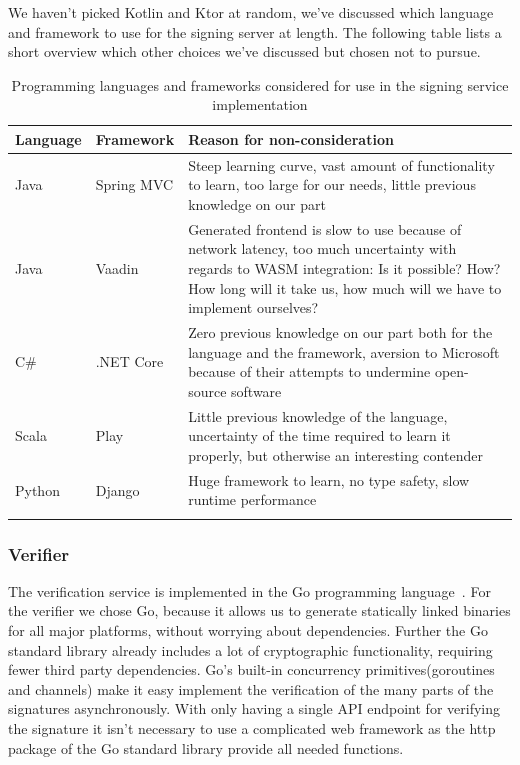 We haven't picked Kotlin and Ktor at random, we've discussed which language and framework to use for the signing server at length.
The following table lists a short overview which other choices we've discussed but chosen not to pursue.

\begin{longtable}{p{1.5cm}p{2cm}p{11cm}}
    \hline
    \textbf{Language} & \textbf{Framework} & \textbf{Reason for non-consideration} \\ \hline
    Java & Spring MVC & Steep learning curve, vast amount of functionality to learn, too large for our needs, little previous knowledge on our part \\ \hline
    Java & Vaadin & Generated frontend is slow to use because of network latency, too much uncertainty with regards to \gls{WASM} integration: Is it possible? How? How long will it take us, how much will we have to implement ourselves? \\ \hline
    C\# & .NET Core & Zero previous knowledge on our part both for the language and the framework, aversion to Microsoft because of their attempts to undermine open-source software~\cite{mseee} \\ \hline
    Scala & Play & Little previous knowledge of the language, uncertainty of the time required to learn it properly, but otherwise an interesting contender \\ \hline
    Python & Django & Huge framework to learn, no type safety, slow runtime performance \\ \hline
    \caption{Programming languages and frameworks considered for use in the signing service implementation}
\end{longtable}


\subsubsection{Verifier}
The verification service is implemented in the Go programming language~\cite{golang}.
For the verifier we chose Go, because it allows us to generate statically linked binaries for all major platforms, without worrying about dependencies.
Further the Go standard library already includes a lot of cryptographic functionality, requiring fewer third party dependencies.
Go's built-in concurrency primitives(goroutines and channels) make it easy implement the verification of the many parts of the signatures asynchronously.
With only having a single \gls{API} endpoint for verifying the signature it isn't necessary to use a complicated web framework as the http package of the Go standard library provide all needed functions.



